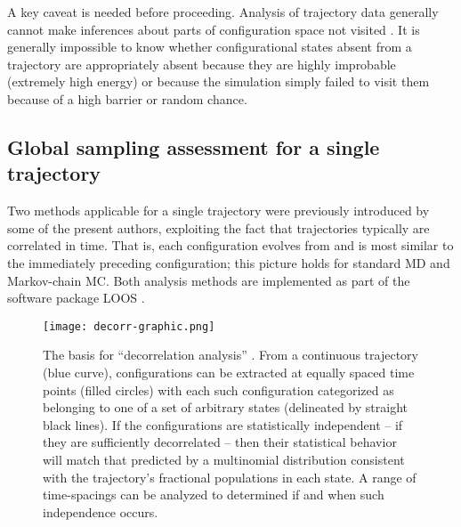 A key caveat is needed before proceeding.
Analysis of trajectory data generally cannot make inferences about parts of configuration space not visited \cite{Grossfield2009}.
It is generally impossible to know whether configurational states absent from a trajectory are appropriately absent because they are highly improbable (extremely high energy) or because the simulation simply failed to visit them because of a high barrier or random chance.

\subsection{Global sampling assessment for a single trajectory}
Two methods applicable for a single trajectory were previously introduced by some of the present authors, exploiting the fact that trajectories typically are correlated in time.
That is, each configuration evolves from and is most similar to the immediately preceding configuration;
this picture holds for standard MD and Markov-chain MC.
Both analysis methods are implemented as part of the software package LOOS \cite{LOOS,LOOS-JCC}.

\begin{figure}
  \centering
  \texttt{[image: decorr-graphic.png]}
  \caption{The basis for ``decorrelation analysis'' \cite{Lyman2007a}.
  From a continuous trajectory (blue curve), configurations can be extracted at equally spaced time points (filled circles) with each such configuration categorized as belonging to one of a set of arbitrary states (delineated by straight black lines).  
  If the configurations are statistically independent -- if they are sufficiently decorrelated -- then their statistical behavior will match that predicted by a multinomial distribution consistent with the trajectory's fractional populations in each state.
  A range of time-spacings can be analyzed to determined if and when such independence occurs.}
  \label{fig:decorr}
\end{figure}

